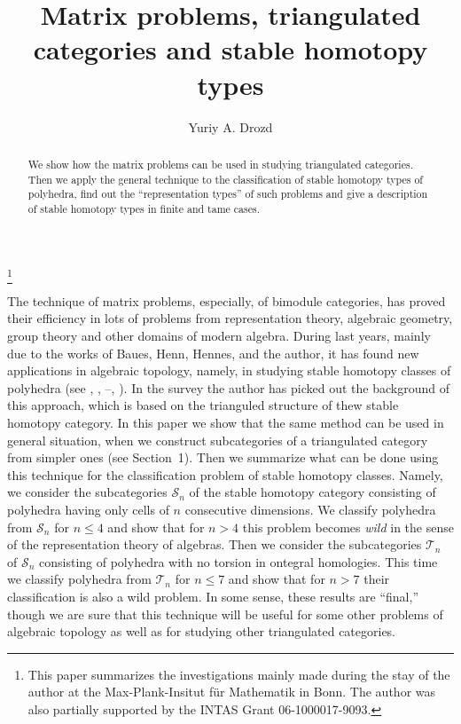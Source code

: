 \documentclass[12pt,a4paper]{amsart}
\theoremstyle{definition}
\theoremstyle{remark}
\numberwithin{equation}{section}
\begin{document}
\title[Matrix problems and stable homotopy]
{Matrix problems, triangulated categories and stable homotopy types}

\author{Yuriy A. Drozd}
\address{Institute of Mathematics, National Academy of Sciences of Ukraine,
 Tereschenkivska 3, 01601 Kiev, Ukraine}
\thanks{This paper summarizes the investigations mainly made during the
  stay of the author at the Max-Plank-Insitut f\"ur Mathematik in Bonn.
 The author was also partially supported by the INTAS Grant
  06-1000017-9093.}

 \begin{abstract}
  We show how the matrix problems can be used in studying triangulated
  categories. Then we apply the general technique to the
  classification of stable homotopy types of polyhedra, find out the
  ``representation types'' of such problems and give a description of
  stable homotopy types in finite and tame cases.
   \end{abstract}

 \maketitle
 \tableofcontents

The technique of matrix problems, especially, of bimodule categories,
has proved their efficiency in lots of problems from representation
theory, algebraic geometry, group theory and other domains of modern
algebra. During last years, mainly due to the works of Baues, Henn,
Hennes, and the author, it has found new applications in algebraic
topology, namely, in studying stable homotopy classes of polyhedra
(see \cite{hen}, \cite{bh}, \cite{bd1}--\cite{bd4}, \cite{d2}). In the
survey \cite{d1} the author has picked out the background of this
approach, which is based on the trianguled structure of thew stable
homotopy category. In this paper we show that the same method can be
used in general situation, when we construct subcategories of a
triangulated category from simpler ones (see Section~1). Then we
summarize what can be done using this technique for the classification
problem of stable homotopy classes. Namely, we consider the
subcategories ${\mathscr S}_n$ of the stable homotopy category consisting of
polyhedra having only cells of $n$ consecutive dimensions. We classify
polyhedra from ${\mathscr S}_n$ for $n\le 4$ and show that for $n>4$ this
problem becomes \emph{wild} in the sense of the representation theory
of algebras. Then we consider the subcategories ${\mathscr T}_n$ of ${\mathscr S}_n$
consisting of polyhedra with no torsion in ontegral homologies. This
time we classify polyhedra from ${\mathscr T}_n$ for $n\le7$ and show that for
$n>7$ their classification is also a wild problem. In some sense,
these results are ``final,'' though we are sure that this technique
will be useful for some other problems of algebraic topology as well
as for studying other triangulated categories.
\end{document}
